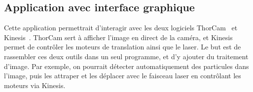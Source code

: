 \subsection{Application avec interface graphique}

Cette application permettrait d'interagir avec les deux logiciels ThorCam~\cite{thorcamSoftware} et Kinesis~\cite{kinesisSoftware}. ThorCam sert à afficher l'image en direct de la caméra, et Kinesis permet de contrôler les moteurs de translation ainsi que le laser. Le but est de rassembler ces deux outils dans un seul programme, et d'y ajouter du traitement d'image. Par exemple, on pourrait détecter automatiquement des particules dans l'image, puis les attraper et les déplacer avec le faisceau laser en contrôlant les moteurs via Kinesis.
